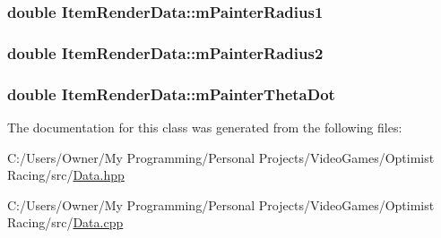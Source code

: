 \hypertarget{class_item_render_data_ab75e41c0c3d9e0ab4a5eea05ff72be73}{
\subsubsection[{m\-Painter\-Radius1}]{\setlength{\rightskip}{0pt plus 5cm}double Item\-Render\-Data\-::m\-Painter\-Radius1}}\label{class_item_render_data_ab75e41c0c3d9e0ab4a5eea05ff72be73}
\hypertarget{class_item_render_data_aecdd63385a831142e8bb1e77168b4760}{
\subsubsection[{m\-Painter\-Radius2}]{\setlength{\rightskip}{0pt plus 5cm}double Item\-Render\-Data\-::m\-Painter\-Radius2}}\label{class_item_render_data_aecdd63385a831142e8bb1e77168b4760}
\hypertarget{class_item_render_data_a201e4edce1dc946735ea9b1b90f5990b}{
\subsubsection[{m\-Painter\-Theta\-Dot}]{\setlength{\rightskip}{0pt plus 5cm}double Item\-Render\-Data\-::m\-Painter\-Theta\-Dot}}\label{class_item_render_data_a201e4edce1dc946735ea9b1b90f5990b}


The documentation for this class was generated from the following files\-:\begin{DoxyCompactItemize}
\item 
C\-:/\-Users/\-Owner/\-My Programming/\-Personal Projects/\-Video\-Games/\-Optimist Racing/src/\hyperlink{_data_8hpp}{Data.\-hpp}\item 
C\-:/\-Users/\-Owner/\-My Programming/\-Personal Projects/\-Video\-Games/\-Optimist Racing/src/\hyperlink{_data_8cpp}{Data.\-cpp}\end{DoxyCompactItemize}
